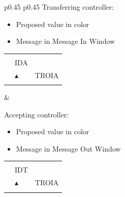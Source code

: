 \documentclass[a4paper,oneside,11pt]{memoir}
\begin{document}
\begin{longtable}{p{} p{}}
  Transferring controller:

  \begin{itemize}
    \item Proposed value in  color
    \item Message in Message In Window
  \end{itemize}

  \begin{tabular}{
    >{\columncolor{Flight Highlight}}l 
    >{\columncolor{Flight Highlight}}l
    >{\columncolor{Flight Highlight}}l }
    {\color{Proposition In} H360} & {\color{Assumed} }       & {\color{Assumed} }      \\
    {\color{Assumed} ABC123} & {\color{Coordination} IDA}       & {\color{Assumed} }      \\
    {\color{Assumed} 100}    & {\color{Assumed} $\blacktriangle$} & {\color{Assumed} TROIA} \\
    {\color{Assumed} 180}    & {\color{Assumed} }          & {\color{Assumed} }     
  \end{tabular}

  &
 
  Accepting controller:

  \begin{itemize}
    \item Proposed value in  color
    \item Message in Message Out Window
  \end{itemize}

  \begin{tabular}{
    >{\columncolor{Flight Highlight}}l 
    >{\columncolor{Flight Highlight}}l
    >{\columncolor{Flight Highlight}}l }
    {\color{Proposition Out} H360} & {\color{Coordination} }       & {\color{Coordination} }      \\
    {\color{Coordination} ABC123} & {\color{Coordination} IDT}       & {\color{Coordination} }      \\
    {\color{Coordination} 100}    & {\color{Coordination} $\blacktriangle$} & {\color{Coordination} TROIA} \\
    {\color{Coordination} 180}    & {\color{Coordination} }          & {\color{Coordination} }     
  \end{tabular}
\end{longtable}

\bigskip
\end{document}
